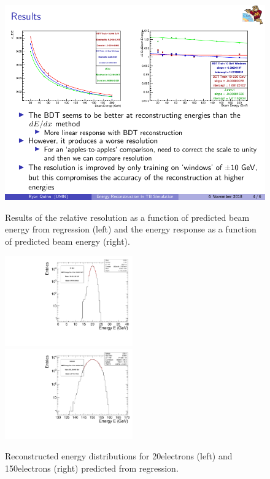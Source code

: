 \begin{figure}[!ht]
    \begin{center}  
    \includegraphics[width=1.0\textwidth]{Fig/fig_HGCAL/energyreco-bdt-Ryan} \\
    \caption{Results of the relative resolution as a function of predicted beam energy from regression (left) and the energy response as a function of predicted beam energy (right).}
    \label{fig:energyreco-bdt-Ryan}
    \end{center}
\end{figure}

\begin{figure}[!ht]
    \begin{center}  
    \includegraphics[width=0.49\textwidth]{Fig/fig_HGCAL/Energy_pred_dynamic_windowed_showershape_v2_20GeV}~
    \includegraphics[width=0.49\textwidth]{Fig/fig_HGCAL/Energy_pred_dynamic_windowed_showershape_v2_150GeV}\\
    \caption{Reconstructed energy distributions for 20\GeV electrons (left) and 150\GeV electrons (right) predicted from regression.}
    \label{fig:energyreco-distributions}
    \end{center}
\end{figure}

